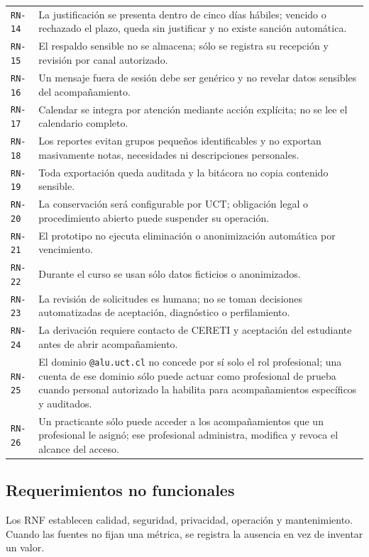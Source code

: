 \documentclass[10pt,a4paper,oneside]{article}
\newcommand{\id}[1]{\texttt{#1}}
\begin{document}
\begin{longtable}{@{}L{0.065\textwidth}L{0.92\textwidth}@{}}
\id{RN-14} & La justificación se presenta dentro de cinco días hábiles; vencido o rechazado el plazo, queda sin justificar y no existe sanción automática.\\
\id{RN-15} & El respaldo sensible no se almacena; sólo se registra su recepción y revisión por canal autorizado.\\
\id{RN-16} & Un mensaje fuera de sesión debe ser genérico y no revelar datos sensibles del acompañamiento.\\
\id{RN-17} & Calendar se integra por atención mediante acción explícita; no se lee el calendario completo.\\
\id{RN-18} & Los reportes evitan grupos pequeños identificables y no exportan masivamente notas, necesidades ni descripciones personales.\\
\id{RN-19} & Toda exportación queda auditada y la bitácora no copia contenido sensible.\\
\id{RN-20} & La conservación será configurable por UCT; obligación legal o procedimiento abierto puede suspender su operación.\\
\id{RN-21} & El prototipo no ejecuta eliminación o anonimización automática por vencimiento.\\
\id{RN-22} & Durante el curso se usan sólo datos ficticios o anonimizados.\\
\id{RN-23} & La revisión de solicitudes es humana; no se toman decisiones automatizadas de aceptación, diagnóstico o perfilamiento.\\
\id{RN-24} & La derivación requiere contacto de CERETI y aceptación del estudiante antes de abrir acompañamiento.\\
\id{RN-25} & El dominio \texttt{@alu.uct.cl} no concede por sí solo el rol profesional; una cuenta de ese dominio sólo puede actuar como profesional de prueba cuando personal autorizado la habilita para acompañamientos específicos y auditados.\\
\id{RN-26} & Un practicante sólo puede acceder a los acompañamientos que un profesional le asignó; ese profesional administra, modifica y revoca el alcance del acceso.\\
\end{longtable}
\normalsize

\subsection{Requerimientos no funcionales}

Los RNF establecen calidad, seguridad, privacidad, operación y mantenimiento. Cuando las fuentes no fijan una métrica, se registra la ausencia en vez de inventar un valor.
\end{document}
